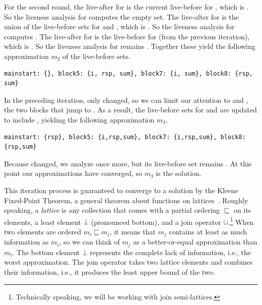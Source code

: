 \documentclass[7x10,nocrop]{TimesAPriori_MIT}%
\begin{document}
For the second round, the live-after for  is the
current live-before for , which is .  So the
liveness analysis for  computes the empty set. The
live-after for  is the union of the live-before sets for
 and , which is .
So the liveness analysis for  computes .  The live-after for  is the live-before for
 (from the previous iteration), which is .
So the liveness analysis for  remains .  Together these yield the following approximation $m_2$ of
the live-before sets.
\begin{center}
  \begin{lstlisting}
mainstart: {}, block5: {i, rsp, sum}, block7: {i, sum}, block8: {rsp, sum}
\end{lstlisting}
\end{center}
In the preceding iteration, only  changed, so we can
limit our attention to  and , the two
blocks that jump to .  As a result, the live-before sets
for  and  are updated to include
, yielding the following approximation $m_3$.
\begin{center}
  \begin{lstlisting}
mainstart: {rsp}, block5: {i,rsp,sum}, block7: {i,rsp,sum}, block8: {rsp,sum}
\end{lstlisting}
\end{center}
Because  changed, we analyze  once more, but
its live-before set remains .  At this point
our approximations have converged, so $m_3$ is the solution.

This iteration process is guaranteed to converge to a solution by the
Kleene Fixed-Point Theorem, a general theorem about functions on
lattices~\citep{Kleene:1952aa}. Roughly speaking, a \emph{lattice} is
any collection that comes with a partial ordering $\sqsubseteq$ on its
elements, a least element $\bot$ (pronounced bottom), and a join
operator $\sqcup$.\footnote{Technically speaking, we will be
  working with join semi-lattices.} When two elements are ordered $m_i
\sqsubseteq m_j$, it means that $m_j$ contains at least as much
information as $m_i$, so we can think of $m_j$ as a better-or-equal
approximation than $m_i$.  The bottom element $\bot$ represents the
complete lack of information, i.e., the worst approximation.  The join
operator takes two lattice elements and combines their information,
i.e., it produces the least upper bound of the two.
\end{document}
